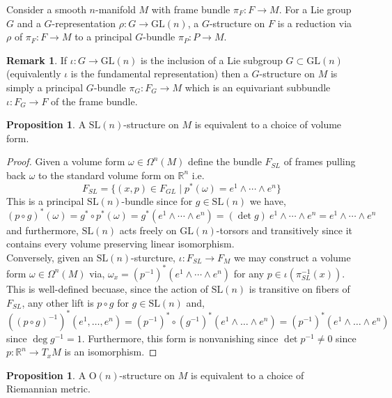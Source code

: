 \documentclass[12pt]{extarticle}
\newcommand{\R}{\mathbb{R}}
\theoremstyle{definition}
\newtheorem{proposition}[theorem]{Proposition}
\newtheorem{remark}{Remark}
\newenvironment{definition}[1][Definition:]{\begin{trivlist}
\item[\hskip \labelsep {\bfseries #1}]}{\end{trivlist}}
\newcommand{\GL}[1]{\mathrm{GL}\left(#1\right)}
\newcommand{\SL}[1]{\mathrm{SL}\left(#1\right)}
\newcommand{\Orth}[1]{\mathrm{O}\left(#1\right)}
\begin{document}
\begin{definition}
Consider a smooth $n$-manifold $M$ with frame bundle $\pi_F : F \to M$. For a Lie group $G$ and a $G$-representation $\rho : G \to \GL{n}$, a $G$-structure on $F$ is a reduction via $\rho$ of $\pi_F : F \to M$ to a principal $G$-bundle $\pi_P : P \to M$.   
\end{definition}

\begin{remark}
If $\iota : G \to \GL{n}$ is the inclusion of a Lie subgroup $G \subset \GL{n}$ (equivalently $\iota$ is the fundamental representation) then a $G$-structure on $M$ is simply a principal $G$-bundle $\pi_G : F_G \to M$ which is an equivariant subbundle $\iota : F_G \to F$ of the frame bundle. 
\end{remark}

\begin{proposition}
A $\SL{n}$-structure on $M$ is equivalent to a choice of volume form. 
\end{proposition}

\begin{proof}
Given a volume form $\omega \in \Omega^n(M)$ define the bundle $F_{SL}$ of frames pulling back $\omega$ to the standard volume form on $\R^n$ i.e. 
\[ F_{SL} = \{ (x, p) \in F_{GL} \mid p^*(\omega) = e^1 \wedge \cdots \wedge e^n \} \]
This is a principal $\SL{n}$-bundle since for $g \in \SL{n}$ we have,
\[ (p \circ g)^*(\omega) = g^* \circ p^*(\omega) = g^*(e^1 \wedge \cdots \wedge e^n) = (\det{g}) \: e^1 \wedge \cdots \wedge e^n = e^1 \wedge \cdots \wedge e^n \]
and furthermore, $\SL{n}$ acts freely on $\GL{n}$-torsors and transitively since it contains every volume preserving linear isomorphism. 
\bigskip\\
Conversely, given an $\SL{n}$-sturcture, $\iota : F_{SL} \to F_{M}$ we may construct a volume form $\omega \in \Omega^n(M)$ via, $\omega_x = (p^{-1})^*(e^1 \wedge \cdots \wedge e^n)$ for any $p \in \iota(\pi_{SL}^{-1}(x))$. This is well-defined becuase, since the action of $\SL{n}$ is transitive on fibers of $F_{SL}$, any other lift is $p \circ g$ for $g \in \SL{n}$ and,
\[ ((p \circ g)^{-1})^*(e^1, \dots, e^n) = (p^{-1})^* \circ (g^{-1})^*(e^1 \wedge \dots \wedge e^n) = (p^{-1})^*(e^1 \wedge \dots \wedge e^n) \]
since $\deg{g^{-1}} = 1$. Furthermore, this form is nonvanishing since $\det{p^{-1}} \neq 0$ since $p : \R^n \to T_x M$ is an isomorphism. 
\end{proof}



\begin{proposition}
A $\Orth{n}$-structure on $M$ is equivalent to a choice of Riemannian metric. 
\end{proposition}
\end{document}
